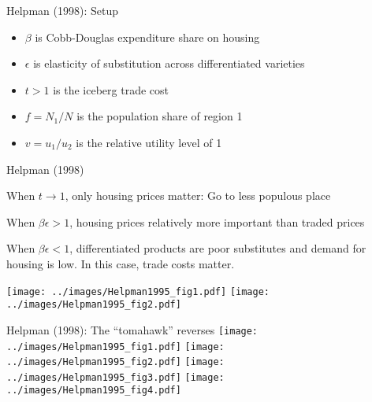 \documentclass[11pt,notes=hide,aspectratio=169]{beamer}
\begin{document}
\begin{frame}{Helpman (1998): Setup}
\begin{itemize}
	\item $\beta$ is Cobb-Douglas expenditure share on housing
	\item $\epsilon$ is elasticity of substitution across differentiated varieties
	\item $t>1$ is the iceberg trade cost
	\item $f = N_1 / N$ is the population share of region 1
	\item $v = u_1 / u_2 $ is the relative utility level of 1
\end{itemize}
\end{frame}
\begin{frame}{Helpman (1998)}
\begin{itemize}
{\small
	\item When $t \to 1$, only housing prices matter: Go to less populous place
	\item When $\beta\epsilon>1$, housing prices relatively more important than traded prices
	\item When $\beta\epsilon<1$, differentiated products are poor substitutes and demand for housing is low. In this case, trade costs matter.
}
\end{itemize}
\texttt{[image: ../images/Helpman1995\_fig1.pdf]}
\texttt{[image: ../images/Helpman1995\_fig2.pdf]}
\end{frame}
\begin{frame}{Helpman (1998): The ``tomahawk'' reverses}
\texttt{[image: ../images/Helpman1995\_fig1.pdf]}
\texttt{[image: ../images/Helpman1995\_fig2.pdf]}
\texttt{[image: ../images/Helpman1995\_fig3.pdf]}
\texttt{[image: ../images/Helpman1995\_fig4.pdf]}
\end{frame}
\end{document}
